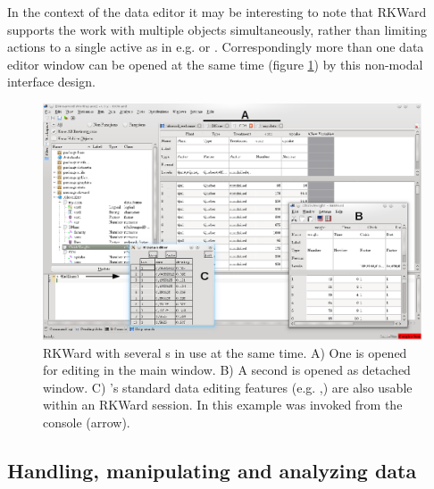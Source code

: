 In the context of the data editor it may be interesting to note that
RKWard supports the work with multiple objects simultaneously, rather than
limiting actions to a single active  as in e.g.  or
. Correspondingly more than one data editor window can be opened
at the same time (figure \ref{fig:data_editors}) by this non-modal interface design.

\begin{figure}[htp]
 \centering
 \includegraphics{../figures/data_editors.png}
 \caption{RKWard with several s in use at the same time. A) One  is opened for editing in the 
 main window. B) A second  is opened as detached window. C) 's standard data editing features 
(e.g. ,) are also usable within an RKWard session. 
In this example  was invoked from the console (arrow).}
 \label{fig:data_editors}
\end{figure}

\subsection{Handling, manipulating and analyzing data}
\label{sec:analyzing_data}

